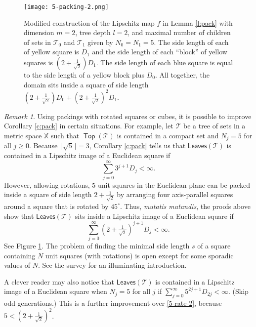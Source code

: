 \documentclass[12pt]{amsart}
\theoremstyle{definition}
\theoremstyle{remark}
\newtheorem{remark}[theorem]{Remark}
\newcommand{\XX}{\mathbb{X}}
\newcommand{\leaves}{\mathsf{Leaves}}
\newcommand{\Top}{\mathop\mathsf{Top}}
\numberwithin{figure}{section}
\numberwithin{equation}{section}
\begin{document}
\begin{figure}\begin{center}\texttt{[image: 5-packing-2.png]}\end{center}\caption{Modified construction of the Lipschitz map $f$ in Lemma \ref{l:pack} with dimension $m=2$, tree depth $l=2$, and maximal number of children of sets in $\mathcal{T}_0$ and $\mathcal{T}_1$ given by $N_0=N_1=5$. The side length of each of yellow square is $D_1$ and the side length of each ``block'' of yellow squares is $(2+\frac{1}{\sqrt{2}})D_1$. The side length of each blue square is equal to the side length of a yellow block plus $D_0$. All together, the domain sits inside a square of side length $(2+\frac{1}{\sqrt{2}})D_0+(2+\frac{1}{\sqrt{2}})^2 D_1$.}\label{fig:5-packing-2}\end{figure}

\begin{remark} Using packings with rotated squares or cubes, it is possible to improve Corollary \ref{c:pack} in certain situations. For example, let $\mathcal{T}$ be a tree of sets in a metric space $\XX$ such that $\Top(\mathcal{T})$ is contained in a compact set and $N_j=5$ for all $j\geq 0$. Because $\lceil \sqrt{5}\rceil = 3$, Corollary \ref{c:pack} tells us that $\leaves(\mathcal{T})$ is contained in a Lipschitz image of a Euclidean square if \begin{equation}\sum_{j=0}^\infty 3^{j+1} D_j<\infty.\end{equation} However, allowing rotations, 5 unit squares in the Euclidean plane can be packed inside a square of side length $2+\frac{1}{\sqrt{2}}$ by arranging four axis-parallel squares around a square that is rotated by $45^\circ$. Thus, \emph{mutatis mutandis}, the proofs above show that $\leaves(\mathcal{T})$ sits inside a Lipschitz image of a Euclidean square if \begin{equation}\label{5-rate-2}\sum_{j=0}^\infty (2+\tfrac{1}{\sqrt{2}})^{j+1} D_j<\infty.\end{equation} See Figure \ref{fig:5-packing-2}. The problem of finding the minimal side length $s$ of a square containing $N$ unit squares (with rotations) is open except for some sporadic values of $N$. See the survey \cite{square-packing-survey} for an illuminating introduction.

A clever reader may also notice that $\leaves(\mathcal{T})$ is contained in a Lipschitz image of a Euclidean square when $N_j=5$ for all $j$ if  $\sum_{j=0}^\infty 5^{2j+1}D_{2j}<\infty$. (Skip odd generations.) This is a further improvement over \eqref{5-rate-2}, because $5<(2+\frac{1}{\sqrt{2}})^2$.
\end{remark}
\end{document}
